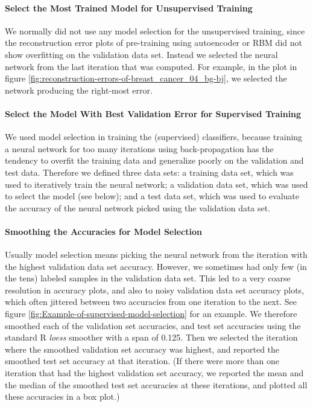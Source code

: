 \paragraph{Select the Most Trained Model for Unsupervised Training}

We normally did not use any model selection for the unsupervised training,
since the reconstruction error plots of pre-training using autoencoder
or RBM did not show overfitting on the validation data set. Instead
we selected the neural network from the last iteration that was computed.
For example, in the plot in figure \vref{fig:reconstruction-errors-of-breast_cancer_04_bg-bj},
we selected the network producing the right-most error.

\paragraph{Select the Model With Best Validation Error for Supervised Training}

We used model selection in training the (supervised) classifiers,
because training a neural network for too many iterations using back-propagation
has the tendency to overfit the training data and generalize poorly
on the validation and test data. Therefore we defined three data sets:
a training data set, which was used to iteratively train the neural
network; a validation data set, which was used to select the model
(see below); and a test data set, which was used to evaluate the accuracy
of the neural network picked using the validation data set.

\paragraph{Smoothing the Accuracies for Model Selection}

Usually model selection means picking the neural network from the
iteration with the highest validation data set accuracy. However,
we sometimes had only few (in the tens) labeled samples in the validation
data set. This led to a very coarse resolution in accuracy plots,
and also to noisy validation data set accuracy plots, which often
jittered between two accuracies from one iteration to the next. See
figure \ref{fig:Example-of-supervised-model-selection} for an example.
We therefore smoothed each of the validation set accuracies, and test
set accuracies using the standard R \emph{loess} smoother with a span
of 0.125. Then we selected the iteration where the smoothed validation
set accuracy was highest, and reported the smoothed test set accuracy
at that iteration. (If there were more than one iteration that had
the highest validation set accuracy, we reported the mean and the
median of the smoothed test set accuracies at these iterations, and
plotted all these accuracies in a box plot.)

